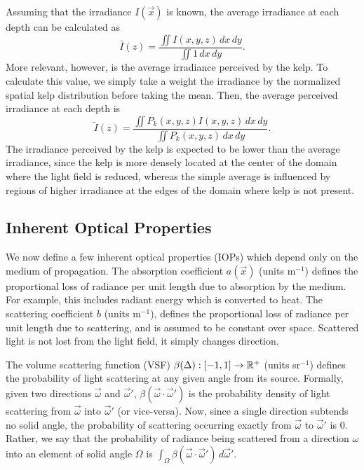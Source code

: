 Assuming that the irradiance $I(\vec{x})$ is known,
the average irradiance at each depth can be calculated as
\begin{equation*}
  \bar{I}(z) = \frac{\iint I(x,y,z)\, dx\, dy}{\iint 1\, dx\, dy}.
\end{equation*}
More relevant, however, is the average irradiance perceived by the kelp.
To calculate this value, we simply take a weight the irradiance by the
normalized spatial kelp distribution before taking the mean.
Then, the average perceived irradiance at each depth is
\newcommand{\Iperk}{\tilde{I}}
\begin{equation*}
   \Iperk(z) = \frac{\iint P_k(x,y,z)I(x,y,z)\, dx\, dy}{\iint P_k(x,y,z)\, dx\, dy}.
\end{equation*}
The irradiance perceived by the kelp is expected to be lower than the average irradiance,
since the kelp is more densely located at the center of the domain where the light field is reduced,
whereas the simple average is influenced by regions of higher irradiance at the edges of the domain where kelp is not present.

\subsection{Inherent Optical Properties}
We now define a few inherent optical properties (IOPs) which depend only on the medium of propagation.
The absorption coefficient $a(\vec{x})$ (units m$^{-1}$) defines the
proportional loss of radiance per unit length due to absorption by the medium.
For example, this includes radiant energy which is converted to heat.
The scattering coefficient $b$ (units m$^{-1}$), defines the proportional loss
of radiance per unit length due to scattering, and is assumed to be constant over space.
Scattered light is not lost from the light field, it simply changes direction.

The volume scattering function (VSF) $\beta(\Delta): [-1, 1] \to \mathbb{R}^+$ (units sr$^{-1}$) defines the probability of light scattering at any given angle from its source.
Formally, given two directions $\vec{\omega}$ and $\vec{\omega}'$, $\beta(\vec{\omega} \cdot \vec{\omega}')$ is the probability density of light scattering from $\vec{\omega}$ into $\vec{\omega}'$ (or vice-versa).
Now, since a single direction subtends no solid angle, the probability of scattering occurring exactly from $\vec{\omega}$ to $\vec{\omega}'$ is 0.
Rather, we say that the probability of radiance being scattered from a direction $\omega$ into an element of solid angle $\Omega$ is $\int_\Omega \beta(\vec{\omega} \cdot \vec{\omega}')\, d\vec{\omega}'$.

